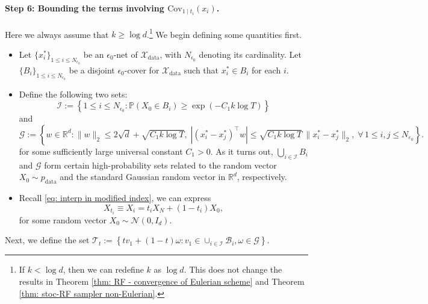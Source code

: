 \documentclass{article}
\theoremstyle{plain}
\theoremstyle{definition}
\theoremstyle{remark}
\newcommand{\red}[1]{{\color{red}#1}}
\def\cB{\mathcal{B}}
\def\cG{\mathcal{G}}
\def\cI{\mathcal{I}}
\def\cT{\mathcal{T}}
\def\Cov{\text{Cov}}
\begin{document}
\paragraph{Step 6: Bounding the terms involving $\Cov_{1 \mid t_i}(x_i)$.} 
Here we always assume that $k\ge \log d$.\footnote{If $k <\log d$, then we can redefine $k$ as $\log d$. This does not change the results in Theorem \ref{thm: RF - convergence of Eulerian scheme} and Theorem \ref{thm: stoc-RF sampler non-Eulerian}.
}
We begin defining some quantities first. 
\begin{itemize}
    \item Let $\{x_i^\ast\}_{1 \le i \le N_{\epsilon_0}}$ be an $\epsilon_0$-net of $\mathcal{X}_{\mathrm{data}}$, with $N_{\epsilon_0}$ denoting its cardinality. Let $\{B_i\}_{1 \le i \le N_{\epsilon_0}}$ be a disjoint $\epsilon_0$-cover for $\mathcal{X}_{\mathrm{data}}$ such that $x_i^\ast \in B_i$ for each $i$. 
    
    \item Define the following two sets:
    \begin{equation}
        \mathcal{I} := \left\{ 1 \le i \le N_{\epsilon_0} : \mathbb{P}(X_0 \in B_i) \ge \exp(-C_1 k \log T) \right\}
        \label{eq:I}
    \end{equation}
    and
    \begin{equation}
        \mathcal{G} := \left\{ w \in \mathbb{R}^d : \|w\|_2 \le 2\sqrt{d} + \sqrt{C_1 k \log T}, \;
        \left| (x_i^\ast - x_j^\ast)^\top w \right|
        \le \sqrt{C_1 k \log T}\, \|x_i^\ast - x_j^\ast\|_2,
        \; \forall\, 1 \le i,j \le N_{\varepsilon_0} \right\}.
        \label{eq:G}
    \end{equation}
    for some sufficiently large universal constant $C_1 > 0$. As it turns out, $\bigcup_{i \in \mathcal{I}} B_i$ and $\mathcal{G}$ form certain high-probability sets related to the random vector $X_0 \sim p_{\mathrm{data}}$ and the standard Gaussian random vector in $\mathbb{R}^d$, respectively.
    
    \item Recall \eqref{eq: interp in modified index}, we can express
    \begin{equation}
        X_{t_i} \equiv X_{i} = t _i  X_N + (1 - t_i) X_0,
        \label{eq:xt}
    \end{equation}
    for some random vector $X_0 \sim \mathcal{N}(0, I_d)$. 
\end{itemize}
Next, we define the set  $\cT_t := \left\{t v_1 + (1-t) \omega: v_1 \in \cup_{i \in \cI}\cB_i, \omega \in \cG \right\}$. %
\end{document}
